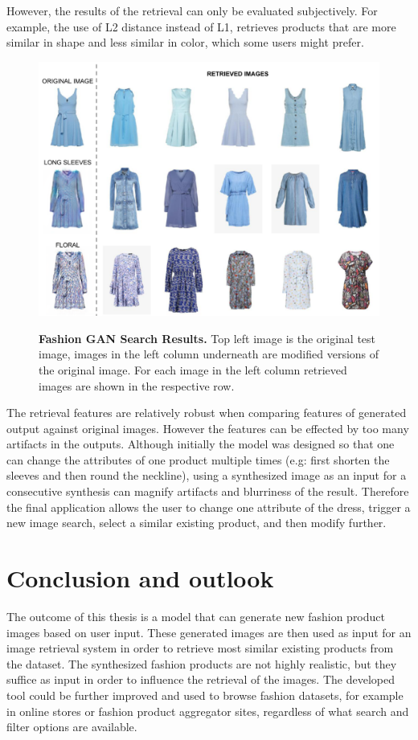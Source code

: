 \documentclass[12pt]{report}
\begin{document}
However, the results of the retrieval can only be evaluated subjectively. For example, the use of L2 distance instead of L1, retrieves products that are more similar in shape and less similar in color, which some users might prefer.

\begin{figure}[h]
\centering
{\includegraphics[width=.8\linewidth]{05_results/gan_search}}
\caption{\label{fig:pipeline_images} \textbf{Fashion GAN Search Results.} Top left image is the original test image, images in the left column underneath are modified versions of the original image. For each image in the left column retrieved images are shown in the respective row.}
\end{figure}

The retrieval features are relatively robust when comparing features of generated output against original images. However the features can be effected by too many artifacts in the outputs.  Although initially the model was designed so that one can change the attributes of one product multiple times (e.g: first shorten the sleeves and then round the neckline), using a synthesized image as an input for a consecutive synthesis can magnify artifacts and blurriness of the result. Therefore the final application allows the user to change one attribute of the dress, trigger a new image search, select a similar existing product, and then modify further.



\chapter{Conclusion and outlook}
The outcome of this thesis is a model that can generate new fashion product images based on user input. These generated images are then used as input for an image retrieval system in order to retrieve most similar existing products from the dataset. The synthesized fashion products are not highly realistic, but they suffice as input in order to influence the retrieval of the images. The developed tool could be further improved and used to browse fashion datasets, for example in online stores or fashion product aggregator sites, regardless of what search and filter options are available.
\end{document}

